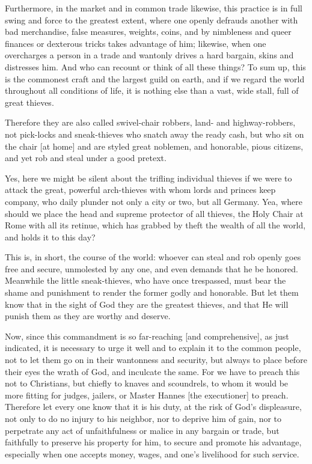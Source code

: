 Furthermore, in the market and in common trade likewise, this practice
is in full swing and force to the greatest extent, where one openly
defrauds another with bad merchandise, false measures, weights, coins,
and by nimbleness and queer finances or dexterous tricks takes
advantage of him; likewise, when one overcharges a person in a trade
and wantonly drives a hard bargain, skins and distresses him. And who
can recount or think of all these things? To sum up, this is the
commonest craft and the largest guild on earth, and if we regard the
world throughout all conditions of life, it is nothing else than a
vast, wide stall, full of great thieves.

Therefore they are also called swivel-chair robbers, land- and
highway-robbers, not pick-locks and sneak-thieves who snatch away the
ready cash, but who sit on the chair [at home] and are styled great
noblemen, and honorable, pious citizens, and yet rob and steal under a
good pretext.

Yes, here we might be silent about the trifling individual thieves if
we were to attack the great, powerful arch-thieves with whom lords and
princes keep company, who daily plunder not only a city or two, but all
Germany. Yea, where should we place the head and supreme protector of
all thieves, the Holy Chair at Rome with all its retinue, which has
grabbed by theft the wealth of all the world, and holds it to this day?


This is, in short, the course of the world: whoever can steal and rob
openly goes free and secure, unmolested by any one, and even demands
that he be honored. Meanwhile the little sneak-thieves, who have once
trespassed, must bear the shame and punishment to render the former
godly and honorable. But let them know that in the sight of God they
are the greatest thieves, and that He will punish them as they are
worthy and deserve.

Now, since this commandment is so far-reaching [and comprehensive], as
just indicated, it is necessary to urge it well and to explain it to
the common people, not to let them go on in their wantonness and
security, but always to place before their eyes the wrath of God, and
inculcate the same. For we have to preach this not to Christians, but
chiefly to knaves and scoundrels, to whom it would be more fitting for
judges, jailers, or Master Hannes [the executioner] to preach.
Therefore let every one know that it is his duty, at the risk of God's
displeasure, not only to do no injury to his neighbor, nor to deprive
him of gain, nor to perpetrate any act of unfaithfulness or malice in
any bargain or trade, but faithfully to preserve his property for him,
to secure and promote his advantage, especially when one accepts money,
wages, and one's livelihood for such service.

